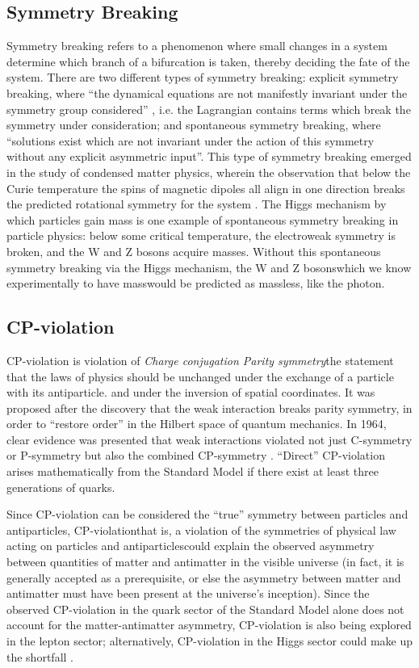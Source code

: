 \subsection{Symmetry Breaking}
Symmetry breaking refers to a phenomenon where small changes in a system determine which branch of a bifurcation is taken, thereby deciding the fate of the system. There are two different types of symmetry breaking: explicit symmetry breaking, where ``the dynamical equations are not manifestly invariant under the symmetry group considered'' \cite{Brading:2013:Symmetry}, i.e. the Lagrangian contains terms which break the symmetry under consideration; and spontaneous symmetry breaking, where “solutions exist which are not invariant under the action of this symmetry without any explicit asymmetric input”. This type of symmetry breaking emerged in the study of condensed matter physics, wherein the observation that below the Curie temperature the spins of magnetic dipoles all align in one direction breaks the predicted rotational symmetry for the system \cite{Brading:2013:Symmetry}. The Higgs mechanism by which particles gain mass is one example of spontaneous symmetry breaking in particle physics: below some critical temperature, the electroweak symmetry is broken, and the W and Z bosons acquire masses. Without this spontaneous symmetry breaking via the Higgs mechanism, the W and Z bosons\textendash which we know experimentally to have mass\textendash would be predicted as massless, like the photon. \cite{Fermi:Electroweak}

\subsection{CP-violation}
CP-violation is violation of \emph{Charge conjugation Parity symmetry}\textendash the statement that the laws of physics should be unchanged under the exchange of a particle with its antiparticle. and under the inversion of spatial coordinates. It was proposed after the discovery that the weak interaction breaks parity symmetry, in order to ``restore order'' in the Hilbert space of quantum mechanics. In 1964, clear evidence was presented that weak interactions violated not just C-symmetry or P-symmetry but also the combined CP-symmetry \cite{CroninFitch:CP}. ``Direct'' CP-violation arises mathematically from the Standard Model if there exist at least three generations of quarks.

Since CP-violation can be considered the ``true'' symmetry between particles and antiparticles, CP-violation\textendash that is, a violation of the symmetries of physical law acting on particles and antiparticles\textendash could explain the observed asymmetry between quantities of matter and antimatter in the visible universe (in fact, it is generally accepted as a prerequisite, or else the asymmetry between matter and antimatter must have been present at the universe's inception). Since the observed CP-violation in the quark sector of the Standard Model alone does not account for the matter-antimatter asymmetry, CP-violation is also being explored in the lepton sector; alternatively, CP-violation in the Higgs sector could make up the shortfall \cite{LHC:CP:Higgs}.


